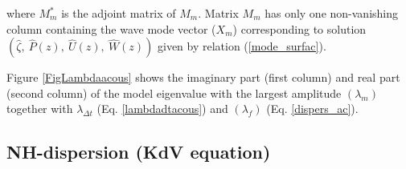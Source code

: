 \documentclass[a4paper]{article}
\numberwithin{equation}{section}
\begin{document}
where $M_m^*$ is the adjoint matrix of $M_m$. Matrix $M_m$ has only one non-vanishing column containing the wave mode vector ($X_m$) corresponding to solution $(\hat{\zeta},\ \hat{P}(z),\ \hat{U}(z),\ \hat{W}(z))$ given by relation (\ref{mode_surfac}).

Figure \ref{FigLambdaacous} shows the imaginary part (first column) and real part (second column) of the model eigenvalue with the largest amplitude $(\lambda_m)$ together with $\lambda_{\Delta t}$ (Eq. \ref{lambdadtacous}) and $(\lambda_f)$ (Eq. \ref{dispers_ac}).

 

\subsection{NH-dispersion (KdV equation) }
\end{document}
